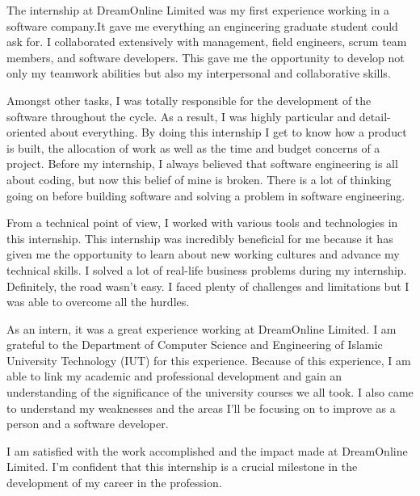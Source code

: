 
\begin{flushleft}
The internship at DreamOnline Limited was my first experience working in a software company.It gave me everything an engineering graduate student could ask for. I collaborated extensively with management, field engineers, scrum team members, and software developers. This gave me the opportunity to develop not only my teamwork abilities but also my interpersonal and collaborative skills.

\vspace{20pt}

Amongst other tasks, I was totally responsible for the development of the software throughout
the cycle. As a result, I was highly particular and detail-oriented about everything. By doing this internship I get to know how a product is built, the allocation of work as well as the time and budget concerns of a project. Before my internship, I always believed that software engineering is all about coding, but now this belief of mine is broken. There is a lot of thinking going on before building software and solving a problem in software engineering.

\vspace{20pt} 

From a technical point of view, I worked with various tools and technologies in this internship.
This internship was incredibly beneficial for me because it has given me the opportunity to learn
about new working cultures and advance my technical skills. I solved a lot of real-life business
problems during my internship. Definitely, the road wasn’t easy. I faced plenty of challenges and
limitations but I was able to overcome all the hurdles.

\vspace{20pt}

As an intern, it was a great experience working at DreamOnline Limited. I am grateful to the
Department of Computer Science and Engineering of Islamic University Technology (IUT) for
this experience. Because of this experience, I am able to link my academic and professional
development and gain an understanding of the significance of the university courses we all took.
I also came to understand my weaknesses and the areas I'll be focusing on to improve as a
person and a software developer.

\vspace{20pt}


I am satisfied with the work accomplished and the impact made at DreamOnline Limited. I'm
confident that this internship is a crucial milestone in the development of my career in the
profession.
\end{flushleft}